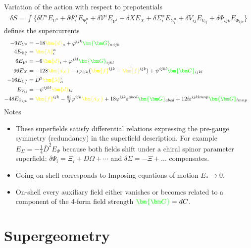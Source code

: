 \documentclass[letter,12pt]{article} %
\def\physical#1{ {\color{green} {\bm {#1}} } }
\def\auxiliary#1{ {\color{yellow} {\bm {#1}} } }
\def\d{ \auxiliary{d_X} }
\def\dX{ \auxiliary{d} }
\def\dY{ \auxiliary{d} }
\def\dYY{ \auxiliary{d} }
\def\f{\auxiliary{f} }
\def\l{ \auxiliary{\lambda} }
\def\G{ \physical{ {\bm G} } }
\begin{document}
Variation of the action with respect to prepotentials
{%
\begin{align}
\delta S = \int 
\Big\{
	\delta U^a E_{U^a}
	+\delta \Psi_i^\alpha E_{\Psi_i^\alpha}
	+\delta \mathcal V^i E_{\mathcal V^i}
	+\delta X E_{X}
	+\delta \Sigma_i^\alpha E_{\Sigma_i^\alpha}
	+\delta V_{ij} E_{V_{ij} }
	+\delta \Phi_{ijk} E_{\Phi_{ijk} }
	\Big\}
\nonumber	
\end{align}
}
defines the supercurrents
{%
\begin{subequations}
\label{E:EoM}
\begin{align}
-9 E_{U^{a}}  &= -18 \dX_a + \varphi^{ijk} \G_{a\, ijk}
\cr
4 E_{\Psi_i^\alpha} &= \l_i^\alpha
\cr
6E_{\mathcal V^i} &= - 6\dY_i
	 +\varphi^{jkl}  \G_{ijkl}
\cr
96 E_X&= -128 \d
 	-i\varphi_{ijk} (\f^{ijk} -\bar \f^{ijk})
	+\psi^{ijkl} \G_{ijkl}
\cr
-16E_{\Sigma^\alpha_i} &= 
	\bar D^2 \l_\alpha^i
\cr
E_{V_{ij} } &= - \psi^{ijkl} \dYY_{kl} 
\cr
-48 E_{\Phi_{ijk} } &=  \f^{ijk} 
	-\tfrac{8i}3\varphi^{ijk} \d 
	+ 18\varphi^{ijk}  \varepsilon^{abcd} \G_{abcd} 
	+12i \varepsilon^{ijklmnp} \G_{lmnp}
\nonumber
\end{align}
\end{subequations}
}
Notes
\begin{itemize}
	\item These superfields satisfy differential relations expressing the pre-gauge symmetry (redundancy) in the superfield description. For example $E_\Sigma = -\tfrac14 \bar D^2 E_\Psi$ because both fields shift under a chiral spinor parameter superfield: $\delta \Psi_i = \Xi_i+D\Omega + \cdots $ and $\delta \Sigma = -\Xi+... $ compensates. 
	\item Going on-shell corresponds to Imposing equations of motion $E_\ast \to 0$.
	\item On-shell every auxiliary field either vanishes or becomes related to a component of the 4-form field strength $\G = dC$.
\end{itemize}



\section{Supergeometry}
\end{document}
